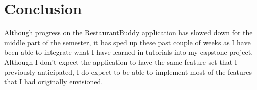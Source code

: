 \documentclass[letterpaper,11pt]{../../templates/texMemo}
\begin{document}
    \section{Conclusion}
    Although progress on the RestaurantBuddy application has slowed down for the middle part of the semester, it has sped up these past couple of weeks as I have been able to integrate what I have learned in tutorials into my capstone project. Although I don't expect the application to have the same feature set that I previously anticipated, I do expect to be able to implement most of the features that I had originally envisioned.

    \newpage

    \printbibliography
\end{document}
